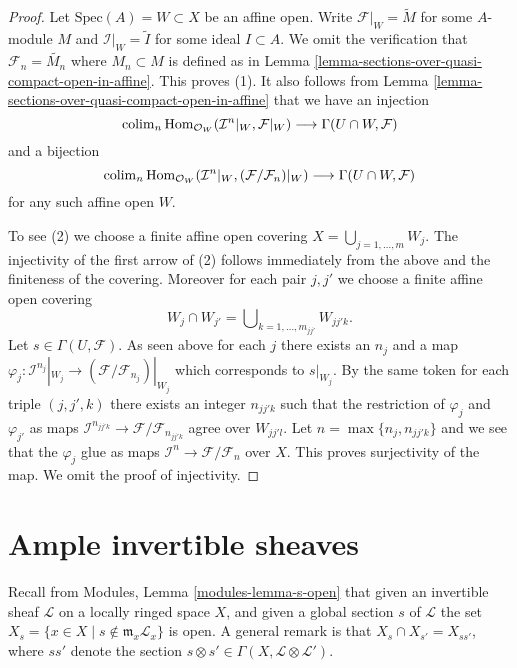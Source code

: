 \begin{proof}
Let $\text{Spec}(A) = W \subset X$ be an affine open.
Write $\mathcal{F}|_W = \widetilde{M}$ for some $A$-module $M$
and $\mathcal{I}|_W = \widetilde{I}$ for some ideal $I \subset A$.
We omit the verification that $\mathcal{F}_n = \widetilde{M_n}$ where
$M_n \subset M$ is defined as in
Lemma \ref{lemma-sections-over-quasi-compact-open-in-affine}.
This proves (1). It also follows from
Lemma \ref{lemma-sections-over-quasi-compact-open-in-affine}
that we have an injection
$$
\mathop{\rm colim}\nolimits_n  \text{Hom}_{\mathcal{O}_W}(
\mathcal{I}^n|_W, \mathcal{F}|_W)
\longrightarrow
\Gamma(U \cap W, \mathcal{F})
$$
and a bijection
$$
\mathop{\rm colim}\nolimits_n  \text{Hom}_{\mathcal{O}_W}(
\mathcal{I}^n|_W, (\mathcal{F}/\mathcal{F}_n)|_W)
\longrightarrow
\Gamma(U \cap W, \mathcal{F})
$$
for any such affine open $W$.

\medskip\noindent
To see (2) we choose a finite affine open covering
$X = \bigcup_{j = 1, \ldots, m} W_j$.
The injectivity of the first arrow of (2) follows immediately from
the above and the finiteness of the covering.
Moreover for each pair
$j, j'$ we choose a finite affine open covering
$$
W_j \cap W_{j'} = \bigcup\nolimits_{k = 1, \ldots, m_{jj'}} W_{jj'k}.
$$
Let $s \in \Gamma(U, \mathcal{F})$. As seen above for each $j$ there exists
an $n_j$ and a map
$\varphi_j : \mathcal{I}^{n_j}|_{W_j} \to
(\mathcal{F}/\mathcal{F}_{n_j})|_{W_j}$
which corresponds to $s|_{W_j}$.
By the same token for each triple $(j, j', k)$ there exists an integer
$n_{jj'k}$ such that the restriction of $\varphi_j$ and $\varphi_{j'}$
as maps $\mathcal{I}^{n_{jj'k}} \to \mathcal{F}/\mathcal{F}_{n_{jj'k}}$
agree over $W_{jj'l}$. Let $n = \max\{n_j, n_{jj'k}\}$ and we see that
the $\varphi_j$ glue as maps
$\mathcal{I}^n \to \mathcal{F}/\mathcal{F}_n$ over $X$.
This proves surjectivity of the map. We omit the proof of injectivity.
\end{proof}












\section{Ample invertible sheaves}
\label{section-ample}

\noindent
Recall from Modules, Lemma \ref{modules-lemma-s-open}
that given an invertible sheaf $\mathcal{L}$ on a locally ringed
space $X$, and given a global section $s$ of $\mathcal{L}$
the set $X_s = \{x \in X \mid s \not \in \mathfrak m_x\mathcal{L}_x\}$
is open. A general remark is that
$X_s \cap X_{s'} = X_{ss'}$, where $ss'$ denote
the section $s \otimes s' \in \Gamma(X, \mathcal{L}\otimes \mathcal{L}')$.

